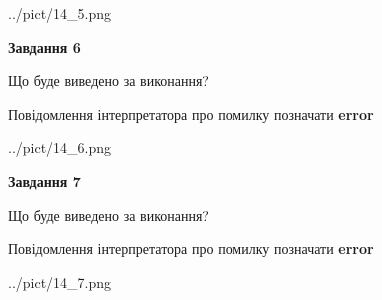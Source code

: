 \documentclass[10pt, ukrainian]{article}
\begin{document}
{\begin {large}
\begin{center}
	{../pict/14_5.png}
\end{center}
\newpage

{\begin {center}\textbf{Завдання 6}\end {center}}\par
Що буде виведено за виконання? \par
Повідомлення інтерпретатора про помилку позначати \textbf{error}

\begin{center}
	{../pict/14_6.png}
\end{center}
\newpage

{\begin {center}\textbf{Завдання 7}\end {center}}\par
Що буде виведено за виконання? \par
Повідомлення інтерпретатора про помилку позначати \textbf{error}

\begin{center}
	{../pict/14_7.png}
\end{center}
\newpage

\end {large}}
\end{document}
